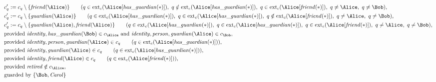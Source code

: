 \begin{align*}
&
c'_
q
 := 
c_
q
 \setminus 
\{
\mathit{\detokenize{
friend
}}
(
\Alice
)
\}
 \qquad (
q
 \in 
\mathrm{ext}_c(
\Alice
[
\mathit{\detokenize{
has_guardian
}}
(
\ast
)
]
)
,\ 
q
 \notin 
\mathrm{ext}_c(
\Alice
[
\mathit{\detokenize{
has_guardian
}}
(
\ast
)
]
)
,\ 
q
 \in 
\mathrm{ext}_c(
\Alice
[
\mathit{\detokenize{
friend
}}
(
\ast
)
]
)
,\ 
q \neq 
\Alice
,\ 
q \neq 
\Bob
)
,\\
&
c'_
q
 := 
c_
q
 \setminus 
\{
\mathit{\detokenize{
guardian
}}
(
\Alice
)
\}
 \qquad (
q
 \in 
\mathrm{ext}_c(
\Alice
[
\mathit{\detokenize{
has_guardian
}}
(
\ast
)
]
)
,\ 
q
 \in 
\mathrm{ext}_c(
\Alice
[
\mathit{\detokenize{
has_guardian
}}
(
\ast
)
]
)
,\ 
q
 \notin 
\mathrm{ext}_c(
\Alice
[
\mathit{\detokenize{
friend
}}
(
\ast
)
]
)
,\ 
q \neq 
\Alice
,\ 
q \neq 
\Bob
)
,\\
&
c'_
q
 := 
c_
q
 \setminus 
\{
\mathit{\detokenize{
guardian
}}
(
\Alice
)
,
\mathit{\detokenize{
friend
}}
(
\Alice
)
\}
 \qquad (
q
 \in 
\mathrm{ext}_c(
\Alice
[
\mathit{\detokenize{
has_guardian
}}
(
\ast
)
]
)
,\ 
q
 \in 
\mathrm{ext}_c(
\Alice
[
\mathit{\detokenize{
has_guardian
}}
(
\ast
)
]
)
,\ 
q
 \in 
\mathrm{ext}_c(
\Alice
[
\mathit{\detokenize{
friend
}}
(
\ast
)
]
)
,\ 
q \neq 
\Alice
,\ 
q \neq 
\Bob
)
,\\
&
\text{provided } 
\mathit{\detokenize{
identity
}}
,
\mathit{\detokenize{
has_guardian
}}
(
\Bob
)
 \in c_
{
\Alice
}
 \text{ and } 
\mathit{\detokenize{
identity
}}
,
\mathit{\detokenize{
person
}}
,
\mathit{\detokenize{
guardian
}}
(
\Alice
)
 \in c_
{
\Bob
}
,\\
&
\text{provided } 
\mathit{\detokenize{
identity
}}
,
\mathit{\detokenize{
person
}}
,
\mathit{\detokenize{
guardian
}}
(
\Alice
)
 \in c_
q
 \qquad (
q \in 
\mathrm{ext}_c(
\Alice
[
\mathit{\detokenize{
has_guardian
}}
(
\ast
)
]
)
)
,\\
&
\text{provided } 
\mathit{\detokenize{
identity
}}
,
\mathit{\detokenize{
guardian
}}
(
\Alice
)
 \in c_
q
 \qquad (
q \in 
\mathrm{ext}_c(
\Alice
[
\mathit{\detokenize{
has_guardian
}}
(
\ast
)
]
)
)
,\\
&
\text{provided } 
\mathit{\detokenize{
identity
}}
,
\mathit{\detokenize{
friend
}}
(
\Alice
)
 \in c_
q
 \qquad (
q \in 
\mathrm{ext}_c(
\Alice
[
\mathit{\detokenize{
friend
}}
(
\ast
)
]
)
)
,\\
&
\text{provided } 
\mathit{\detokenize{
retired
}}
 \notin c_
{
\Alice
}
,\\
&
\text{guarded by } \{
\Bob
,
\mathit{Carol}
\}
\end{align*}

